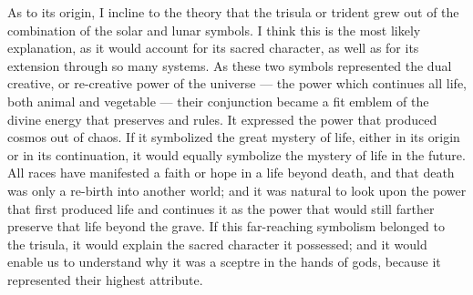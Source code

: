 \documentclass[a4paper, 11pt, oneside, english, landscape, twocolumn]{article}
\begin{document}
As to its origin, I incline to the theory that the trisula or trident grew out of the combination of the solar and lunar symbols. I think this is the most likely explanation, as it would account for its sacred character, as well as for its extension through so many systems. As these two symbols represented the dual creative, or re-creative power of the universe --- the power which continues all life, both animal and vegetable --- their conjunction became a fit emblem of the divine energy that preserves and rules. It expressed the power that produced cosmos out of chaos. If it symbolized the great mystery of life, either in its origin or in its continuation, it would equally symbolize the mystery of life in the future. All races have manifested a faith or hope in a life beyond death, and that death was only a re-birth into another world; and it was natural to look upon the power that first produced life and continues it as the power that would still farther preserve that life beyond the grave. If this far-reaching symbolism belonged to the trisula, it would explain the sacred character it possessed; and it would enable us to understand why it was a sceptre in the hands of gods, because it represented their highest attribute.
\end{document}
